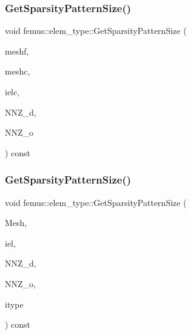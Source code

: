 \subsubsection{\texorpdfstring{Get\+Sparsity\+Pattern\+Size()}{GetSparsityPatternSize()}\hspace{0.1cm}{\footnotesize\ttfamily [2/3]}}
{\footnotesize\ttfamily void femus\+::elem\+\_\+type\+::\+Get\+Sparsity\+Pattern\+Size (\begin{DoxyParamCaption}\item[{const \mbox{\hyperlink{classfemus_1_1_mesh}{Mesh}} \&}]{meshf,  }\item[{const \mbox{\hyperlink{classfemus_1_1_mesh}{Mesh}} \&}]{meshc,  }\item[{const int \&}]{ielc,  }\item[{\mbox{\hyperlink{classfemus_1_1_numeric_vector}{Numeric\+Vector}} $\ast$}]{N\+N\+Z\+\_\+d,  }\item[{\mbox{\hyperlink{classfemus_1_1_numeric_vector}{Numeric\+Vector}} $\ast$}]{N\+N\+Z\+\_\+o }\end{DoxyParamCaption}) const}

\mbox{\label{classfemus_1_1elem__type_a9e3cfe2ed283c16125594e5c3a02c8cd}} 
\subsubsection{\texorpdfstring{Get\+Sparsity\+Pattern\+Size()}{GetSparsityPatternSize()}\hspace{0.1cm}{\footnotesize\ttfamily [3/3]}}
{\footnotesize\ttfamily void femus\+::elem\+\_\+type\+::\+Get\+Sparsity\+Pattern\+Size (\begin{DoxyParamCaption}\item[{const \mbox{\hyperlink{classfemus_1_1_mesh}{Mesh}} \&}]{Mesh,  }\item[{const int \&}]{iel,  }\item[{\mbox{\hyperlink{classfemus_1_1_numeric_vector}{Numeric\+Vector}} $\ast$}]{N\+N\+Z\+\_\+d,  }\item[{\mbox{\hyperlink{classfemus_1_1_numeric_vector}{Numeric\+Vector}} $\ast$}]{N\+N\+Z\+\_\+o,  }\item[{const unsigned \&}]{itype }\end{DoxyParamCaption}) const}

